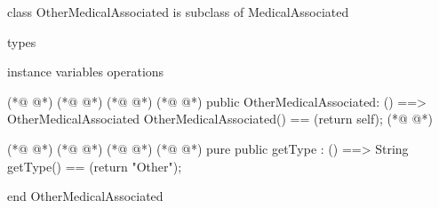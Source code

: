 \begin{vdmpp}[breaklines=true]
class OtherMedicalAssociated is subclass of MedicalAssociated

types

instance variables
operations
 
(*@
\label{Nurse:8}
@*)
(*@
\label{Nurse:8}
@*)
(*@
\label{OtherMedicalAssociated:8}
@*)
(*@
\label{Nurse:8}
@*)
 public OtherMedicalAssociated: () ==> OtherMedicalAssociated
  OtherMedicalAssociated() == (return self);
(*@
\label{Nurse:10}
@*)
  
(*@
\label{getType:11}
@*)
(*@
\label{getType:11}
@*)
(*@
\label{getType:11}
@*)
(*@
\label{getType:11}
@*)
 pure public getType : () ==> String
  getType() == (return "Other");

end OtherMedicalAssociated
\end{vdmpp}
